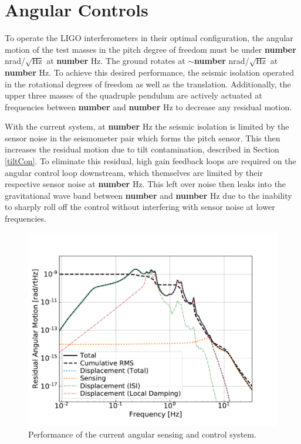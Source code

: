 \documentclass [12pt, proquest]{uwthesis}[2019]
\begin{document}
\section{Angular Controls}
To operate the LIGO interferometers in their optimal configuration, the angular motion of the test masses in the pitch degree of freedom must be under \textbf{number} nrad/$\sqrt{\text{Hz}}$ at \textbf{number} Hz. The ground rotates at $\sim$\textbf{number} nrad/$\sqrt{\text{Hz}}$ at \textbf{number} Hz. To achieve this desired performance, the seismic isolation operated in the rotational degrees of freedom as well as the translation. Additionally, the upper three masses of the quadruple pendulum are actively actuated at frequencies between \textbf{number} and \textbf{number} Hz to decrease any residual motion.

With the current system, at \textbf{number} Hz the seismic isolation is limited by the sensor noise in the seismometer pair which forms the pitch sensor. This then increases the residual motion due to tilt contamination, described in Section \ref{tiltCon}. To eliminate this residual, high gain feedback loops are required on the angular control loop downstream, which themselves are limited by their respective sensor noise at \textbf{number} Hz. This left over noise then leaks into the gravitational wave band between \textbf{number} and \textbf{number} Hz due to the inability to sharply roll off the control without interfering with sensor noise at lower frequencies.

\begin{figure}
\begin{center}
\includegraphics[width=\textwidth]{cBRS_ASC_Without.pdf}
\caption{Performance of the current angular sensing and control system.}
\label{ascWithout}
\end{center}
\end{figure}
\end{document}

